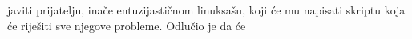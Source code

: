 \documentclass{exam}
\begin{document}
                                                                                                                                javiti
                                                                                                                                prijatelju,
                                                                                                                                inače
                                                                                                                                entuzijastičnom
                                                                                                                                linuksašu,
                                                                                                                                koji
                                                                                                                                će
                                                                                                                                mu
                                                                                                                                napisati
                                                                                                                                skriptu
                                                                                                                                koja
                                                                                                                                će
                                                                                                                                riješiti
                                                                                                                                sve
                                                                                                                                njegove
                                                                                                                                probleme.
                                                                                                                                Odlučio
                                                                                                                                je
                                                                                                                                da
                                                                                                                                će
\end{document}
